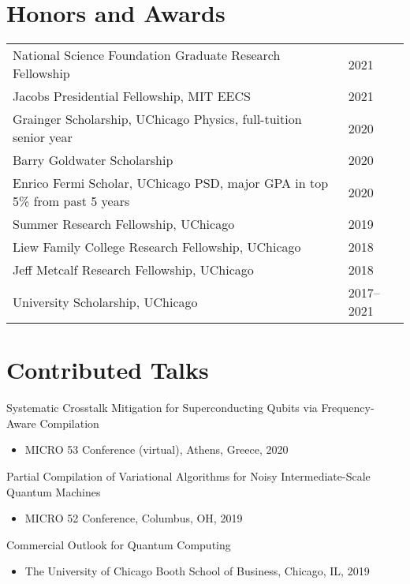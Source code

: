\documentclass[letterpaper, 11pt]{article}
\begin{document}
\section{Honors and Awards}
\begin{tabular}{@{} L{14.5cm} @{} R{2.01cm} @{}}
  National Science Foundation Graduate Research Fellowship & 2021\\
  Jacobs Presidential Fellowship, MIT EECS & 2021\\
  Grainger Scholarship, UChicago Physics, full-tuition senior year & 2020\\
  Barry Goldwater Scholarship & 2020\\
  Enrico Fermi Scholar, UChicago PSD, major GPA in top 5\% from past 5 years & 2020\\
  Summer Research Fellowship, UChicago & 2019\\
  Liew Family College Research Fellowship, UChicago & 2018\\
  Jeff Metcalf Research Fellowship, UChicago & 2018 \\
  University Scholarship, UChicago & 2017--2021\\
\end{tabular}

\section{Contributed Talks}
Systematic Crosstalk Mitigation for Superconducting Qubits via Frequency-Aware Compilation\\
\begin{itemize}
  \item MICRO 53 Conference (virtual), Athens, Greece, 2020\\
\end{itemize}
Partial Compilation of Variational Algorithms for Noisy Intermediate-Scale Quantum Machines\\
\begin{itemize}
\item MICRO 52 Conference, Columbus, OH, 2019\\
\end{itemize}
Commercial Outlook for Quantum Computing\\
\begin{itemize}
\item The University of Chicago Booth School of Business, Chicago, IL, 2019\\
\end{itemize}
\end{document}
